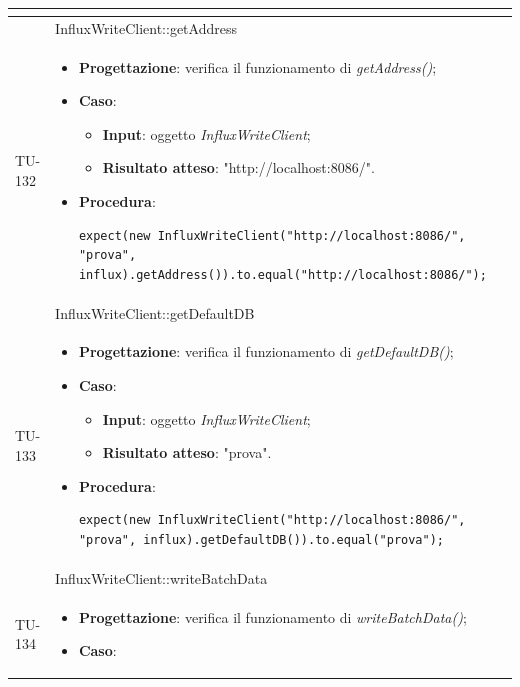 \begin{longtable}{|C{1.5cm}|C{14.5cm}|}
\begin{itemize}
\end{itemize}\\
\hline
{} & InfluxWriteClient::getAddress
\\ \hline
{TU-132} &
\begin{itemize}
	\item \textbf{Progettazione}: verifica il funzionamento di \emph{getAddress()};
	\item \textbf{Caso}: 
	\begin{itemize}
		\item \textbf{Input}: oggetto \emph{InfluxWriteClient};
		\item \textbf{Risultato atteso}: "http://localhost:8086/".
	\end{itemize}
	\item \textbf{Procedura}:
	\begin{lstlisting}
expect(new InfluxWriteClient("http://localhost:8086/", "prova", influx).getAddress()).to.equal("http://localhost:8086/");
	\end{lstlisting}
\end{itemize}\\
\hline
{} & InfluxWriteClient::getDefaultDB
\\ \hline
{TU-133} &
\begin{itemize}
	\item \textbf{Progettazione}: verifica il funzionamento di \emph{getDefaultDB()};
	\item \textbf{Caso}: 
	\begin{itemize}
		\item \textbf{Input}: oggetto \emph{InfluxWriteClient};
		\item \textbf{Risultato atteso}: "prova".
	\end{itemize}
	\item \textbf{Procedura}:
	\begin{lstlisting}
expect(new InfluxWriteClient("http://localhost:8086/", "prova", influx).getDefaultDB()).to.equal("prova");
	\end{lstlisting}
\end{itemize}\\
\hline
{} & InfluxWriteClient::writeBatchData
\\ \hline
{TU-134} &
\begin{itemize}
	\item \textbf{Progettazione}: verifica il funzionamento di \emph{writeBatchData()};
	\item \textbf{Caso}: 

\end{itemize}
\end{longtable}
